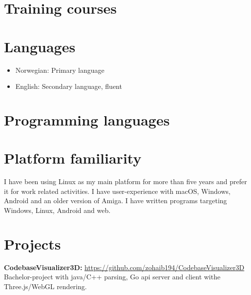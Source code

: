 \documentclass{crudecv/crudecv}
\begin{document}
\section*{Training courses}
\begin{experiences}
\end{experiences}

\section*{Languages}
\begin{itemize}
    \item Norwegian: Primary language
    \item English: Secondary language, fluent
\end{itemize}


\section*{Programming languages}
\begin{skills}
\end{skills}


\section*{Platform familiarity}
I have been using Linux as my main platform for more than five years and prefer it for work related activities. I have user-experience with macOS, Windows, Android and an older version of Amiga. I have written programs targeting Windows, Linux, Android and web.

\section*{Projects}
\textbf{CodebaseVisualizer3D:} \hfill \href{https://github.com/zohaib194/CodebaseVisualizer3D}{https://github.com/zohaib194/CodebaseVisualizer3D} \\
Bachelor-project with java/C++ parsing, Go api server and client withe Three.js/WebGL rendering.
\end{document}
